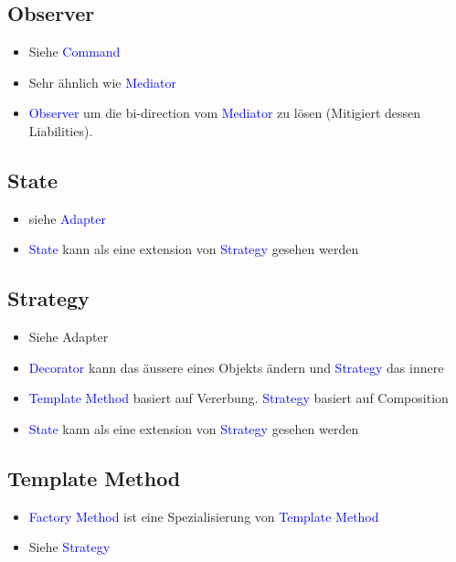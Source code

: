 \subsection{Observer}

\begin{itemize}
    \item Siehe \textcolor{blue}{Command}
    \item Sehr ähnlich wie \textcolor{blue}{Mediator}
    \item \textcolor{blue}{Observer} um die bi-direction vom \textcolor{blue}{Mediator} zu lösen (Mitigiert dessen Liabilities).
\end{itemize}

\subsection{State}

\begin{itemize}
    \item siehe \textcolor{blue}{Adapter}
    \item \textcolor{blue}{State} kann als eine extension von \textcolor{blue}{Strategy} gesehen werden
\end{itemize}

\subsection{Strategy}

\begin{itemize}
    \item Siehe Adapter
    \item \textcolor{blue}{Decorator} kann das äussere eines Objekts ändern und \textcolor{blue}{Strategy} das innere
    \item \textcolor{blue}{Template Method} basiert auf Vererbung. \textcolor{blue}{Strategy} basiert auf Composition
    \item \textcolor{blue}{State} kann als eine extension von \textcolor{blue}{Strategy} gesehen werden
\end{itemize}

\subsection{Template Method}

\begin{itemize}
    \item \textcolor{blue}{Factory Method} ist eine Spezialisierung von \textcolor{blue}{Template Method}
    \item Siehe \textcolor{blue}{Strategy}
\end{itemize}


